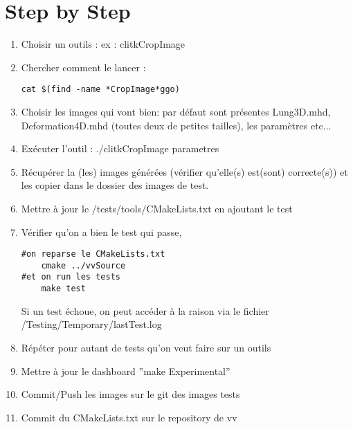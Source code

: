 \documentclass[12pt]{report}
\begin{document}
\section{Step by Step}
\begin{enumerate}
	\item Choisir un outils : ex : clitkCropImage
	\item Chercher comment le lancer : 
\begin{verbatim}
cat $(find -name *CropImage*ggo)
\end{verbatim}
	\item Choisir les images qui vont bien: par défaut sont présentes Lung3D.mhd, Deformation4D.mhd (toutes deux de petites
tailles), les paramètres etc...
	\item Exécuter l'outil : ./clitkCropImage {parametres}
	\item Récupérer la (les) images générées (vérifier qu'elle(s) est(sont) correcte(s)) et les copier dans le dossier
des images de test.
	\item Mettre à jour le /tests/tools/CMakeLists.txt en ajoutant le test
	\item Vérifier qu'on a bien le test qui passe, 
\begin{verbatim}
#on reparse le CMakeLists.txt
	cmake ../vvSource
#et on run les tests
	make test
\end{verbatim}
Si un test échoue, on peut accéder à la raison via le fichier /Testing/Temporary/lastTest.log
	\item Répéter pour autant de tests qu'on veut faire sur un outils
	\item Mettre à jour le dashboard ''make Experimental''
	\item Commit/Push les images sur le git des images tests
	\item Commit du CMakeLists.txt sur le repository de vv
\end{enumerate}
\end{document}
